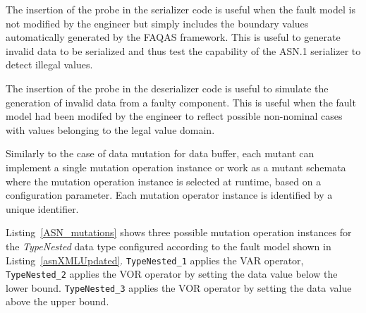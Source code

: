 The insertion of the probe in the serializer code is useful when the fault model is not modified by the engineer but simply includes the boundary values automatically generated by the FAQAS framework. 
This is useful to generate invalid data to be serialized and thus test the capability of the ASN.1 serializer to detect illegal values.

The insertion of the probe in the deserializer code is useful to simulate the generation of invalid data from a faulty component. This is useful when the fault model had been modifed by the engineer to reflect possible non-nominal cases with values belonging to the legal value domain.


Similarly to the case of data mutation for data buffer, each mutant can implement a single mutation operation instance or work as a mutant schemata where the mutation operation instance is selected at runtime, based on a configuration parameter. Each mutation operator instance is identified by a unique identifier. 







Listing~\ref{ASN_mutations} shows three possible mutation operation instances for the \emph{TypeNested} data type configured according to the fault model shown in Listing~\ref{asnXMLUpdated}.
\texttt{TypeNested\_1} applies the VAR operator,
 \texttt{TypeNested\_2} applies the VOR operator by setting the data value below the lower bound.
 \texttt{TypeNested\_3} applies the VOR operator by setting the data value above the upper bound.



